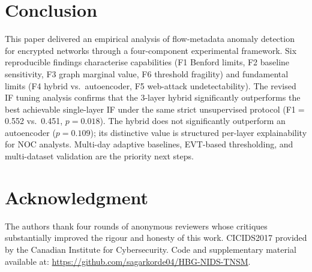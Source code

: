 \documentclass[journal,10pt,twoside]{IEEEtran}
\begin{document}
\section{Conclusion}
\label{sec:conclusion}

This paper delivered an empirical analysis of flow-metadata anomaly
detection for encrypted networks through a four-component
experimental framework.  Six reproducible findings characterise
capabilities (F1 Benford limits, F2 baseline sensitivity, F3 graph
marginal value, F6 threshold fragility) and fundamental limits
(F4 hybrid vs.\ autoencoder, F5 web-attack undetectability).  The
revised IF tuning analysis confirms that the 3-layer hybrid
significantly outperforms the best achievable single-layer IF under
the same strict unsupervised protocol (F1$=$0.552 vs.\ 0.451,
$p{=}0.018$).  The hybrid does not significantly outperform an
autoencoder ($p{=}0.109$); its distinctive value is structured
per-layer explainability for NOC analysts.  Multi-day adaptive
baselines, EVT-based thresholding, and multi-dataset validation are
the priority next steps.

\section*{Acknowledgment}
The authors thank four rounds of anonymous reviewers whose critiques
substantially improved the rigour and honesty of this work.
CICIDS2017 provided by the Canadian Institute for Cybersecurity.
Code and supplementary material available at:
\url{https://github.com/sagarkorde04/HBG-NIDS-TNSM}.

\clearpage
\balance


\end{document}
